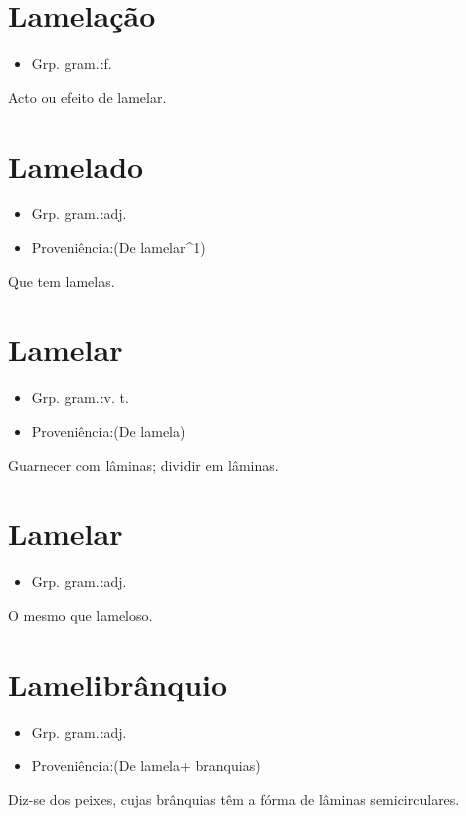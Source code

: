 \section{Lamelação}
\begin{itemize}
\item {Grp. gram.:f.}
\end{itemize}
Acto ou efeito de lamelar.
\section{Lamelado}
\begin{itemize}
\item {Grp. gram.:adj.}
\end{itemize}
\begin{itemize}
\item {Proveniência:(De \textunderscore lamelar\textunderscore ^1)}
\end{itemize}
Que tem lamelas.
\section{Lamelar}
\begin{itemize}
\item {Grp. gram.:v. t.}
\end{itemize}
\begin{itemize}
\item {Proveniência:(De \textunderscore lamela\textunderscore )}
\end{itemize}
Guarnecer com lâminas; dividir em lâminas.
\section{Lamelar}
\begin{itemize}
\item {Grp. gram.:adj.}
\end{itemize}
O mesmo que \textunderscore lameloso\textunderscore .
\section{Lamelibrânquio}
\begin{itemize}
\item {Grp. gram.:adj.}
\end{itemize}
\begin{itemize}
\item {Proveniência:(De \textunderscore lamela\textunderscore  + \textunderscore branquias\textunderscore )}
\end{itemize}
Diz-se dos peixes, cujas brânquias têm a fórma de lâminas semicirculares.
